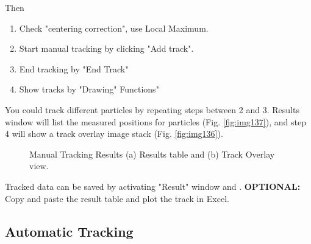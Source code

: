 \begin{indentexercise}{1}
Then 
\begin{enumerate}
\item Check "centering correction", use Local Maximum.
\item Start manual tracking by clicking "Add track".
\item End tracking by "End Track"
\item Show tracks by "Drawing" Functions"
\end{enumerate}

You could track different particles by repeating steps between 2 and 3. Results window will list the measured positions for particles (Fig. \ref{fig:img137}), and step 4 will show a track overlay image stack (Fig. \ref{fig:img136}).  

\begin{figure}[htbp]
\centering
{}
\caption{ Manual Tracking Results (a) Results table and (b) Track Overlay view.}
\label{fig:ManualTrackResults}
\end{figure} 

Tracked data can be saved by activating "Result" window and .  \textbf{OPTIONAL:} Copy and paste the result table and plot the track in Excel.
\end{indentexercise}

\subsection{Automatic Tracking}
\label{subsubsec:autotracker}

